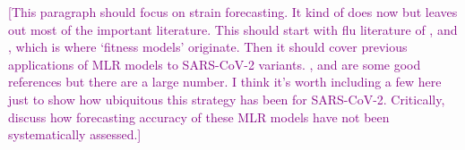 \documentclass[11pt,oneside,letterpaper]{article}
\def\tbc#1{\textcolor{purple}{[#1]}}
\begin{document}

\tbc{This paragraph should focus on strain forecasting. It kind of does now but leaves out most of the important literature. This should start with flu literature of \cite{luksza2014predictive}, \cite{morris2018predictive} and \cite{huddleston2020integrating}, which is where `fitness models' originate. Then it should cover previous applications of MLR models to SARS-CoV-2 variants. \cite{annavajhala2021emergence}, \cite{faria2021genomics} and \cite{obermeyer2022analysis} are some good references but there are a large number. I think it's worth including a few here just to show how ubiquitous this strategy has been for SARS-CoV-2. Critically, discuss how forecasting accuracy of these MLR models have not been systematically assessed.}
\end{document}
